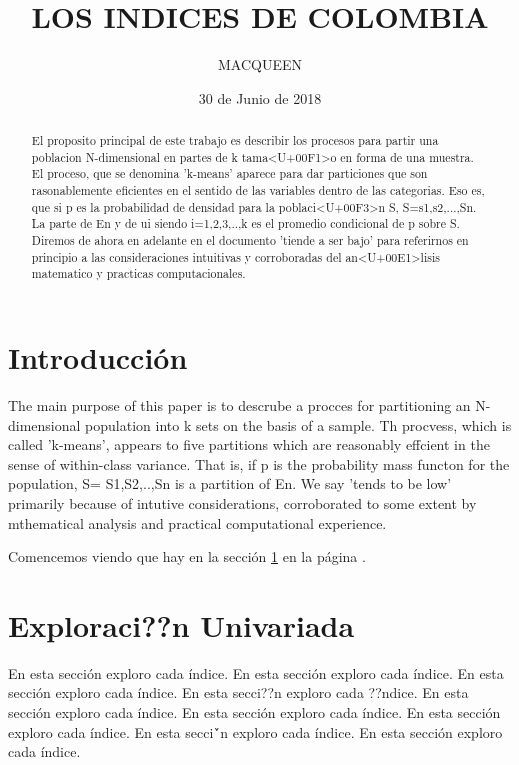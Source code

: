 \documentclass{article}
\title{LOS INDICES DE COLOMBIA}
\author[1]{\normalsize MACQUEEN}
\affil[1,2]{\small  Escuela de Ingenier\'ia,Universidad de los Andes\\
\texttt{{delcurso,deallado}@uniandes.edu.col}}
\affil[1]{\small Instituto de altas investigaciones financieras\\
Banco del Parque\\
\texttt{delcurso@bp.com.col}}
\date{30 de Junio de 2018}
\begin{document}


\maketitle


\begin{abstract}
El proposito principal de este trabajo es describir los procesos para partir una poblacion N-dimensional en partes de k tama<U+00F1>o en forma de una muestra. El proceso, que se denomina 'k-means' aparece para dar particiones que son rasonablemente eficientes en el sentido de las variables dentro de las categorias. Eso es, que si p es la probabilidad de densidad para la poblaci<U+00F3>n S, S=s1,s2,...,Sn. La parte de En y de ui siendo i=1,2,3,..,k es el promedio condicional de p sobre S. Diremos de ahora en adelante en el documento 'tiende a ser bajo' para referirnos en principio a las consideraciones intuitivas y corroboradas del an<U+00E1>lisis matematico y practicas computacionales.
\end{abstract}

\section*{Introducci\'on}

The main purpose of this paper is to descrube a procces for partitioning an N-dimensional population into k sets on the basis of a sample. Th procvess, which is called 'k-means', appears to five partitions which are reasonably effcient in the sense of within-class variance. That is, if p is the probability mass functon for the population, S= S1,S2,..,Sn is a partition of En. We say 'tends to be low' primarily because of intutive considerations, corroborated to some extent by mthematical analysis and practical computational experience.


Comencemos viendo que hay en la secci\'on \ref{univariada} en la p\'agina \pageref{univariada}.

\clearpage



\section{Exploraci??n Univariada}\label{univariada}

En esta secci\'on exploro cada \'indice. En esta secci\'on exploro cada \'indice. En esta secci\'on exploro cada \'indice. En esta secci??n exploro cada ??ndice. En esta secci\'on exploro cada \'indice. En esta secci\'on exploro cada \'indice. En esta secci\'on exploro cada \'indice. En esta secci\'`n exploro cada \'indice. En esta secci\'on exploro cada \'indice.
\end{document}

